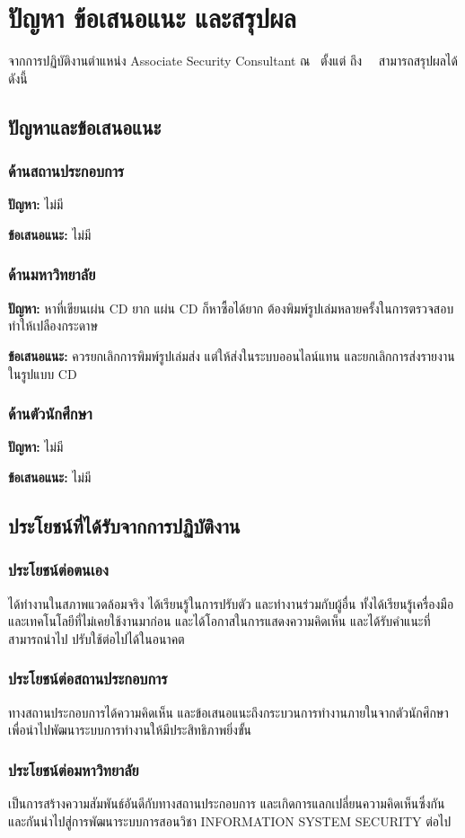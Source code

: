 \chapter{ปัญหา ข้อเสนอแนะ และสรุปผล}
\label{chapter:result}

จากการปฏิบัติงานตำแหน่ง Associate Security Consultant ณ \Company \ ตั้งแต่ \StartDWork ถึง \ \EndDWork \ สามารถสรุปผลได้ดังนี้

\section{ปัญหาและข้อเสนอแนะ}
\subsection{ด้านสถานประกอบการ}

\textbf{ปัญหา:} ไม่มี

\textbf{ข้อเสนอแนะ:} ไม่มี

\subsection{ด้านมหาวิทยาลัย}

\textbf{ปัญหา:} หาที่เขียนเผ่น CD ยาก แผ่น CD ก็หาซื้อได้ยาก ต้องพิมพ์รูปเล่มหลายครั้งในการตรวจสอบ ทำให้เปลืองกระดาษ

\textbf{ข้อเสนอแนะ:} ควรยกเลิกการพิมพ์รูปเล่มส่ง แต่ให้ส่งในระบบออนไลน์แทน และยกเลิกการส่งรายงานในรูปแบบ CD

\subsection{ด้านตัวนักศึกษา}

\textbf{ปัญหา:} ไม่มี

\textbf{ข้อเสนอแนะ:} ไม่มี

\section{ประโยชน์ที่ได้รับจากการปฏิบัติงาน}
\subsection{ประโยชน์ต่อตนเอง}

ได้ทำงานในสภาพแวดล้อมจริง ได้เรียนรู้ในการปรับตัว และทำงานร่วมกับผู้อื่น
ทั้งได้เรียนรู้เครื่องมือและเทคโนโลยีที่ไม่เคยใช้งานมาก่อน
และได้โอกาสในการแสดงความคิดเห็น และได้รับคำแนะที่สามารถนำไป
ปรับใช้ต่อไปได้ในอนาคต

\subsection{ประโยชน์ต่อสถานประกอบการ}

ทางสถานประกอบการได้ความคิดเห็น และข้อเสนอแนะถึงกระบวนการทำงานภายในจากตัวนักศึกษา เพื่อนำไปพัฒนาระบบการทำงานให้มีประสิทธิภาพยิ่งขั้น
\subsection{ประโยชน์ต่อมหาวิทยาลัย}

เป็นการสร้างความสัมพันธ์อันดีกับทางสถานประกอบการ และเกิดการแลกเปลี่ยนความคิดเห็นซึ่งกันและกันนำไปสู่การพัฒนาระบบการสอนวิชา INFORMATION SYSTEM SECURITY
ต่อไป